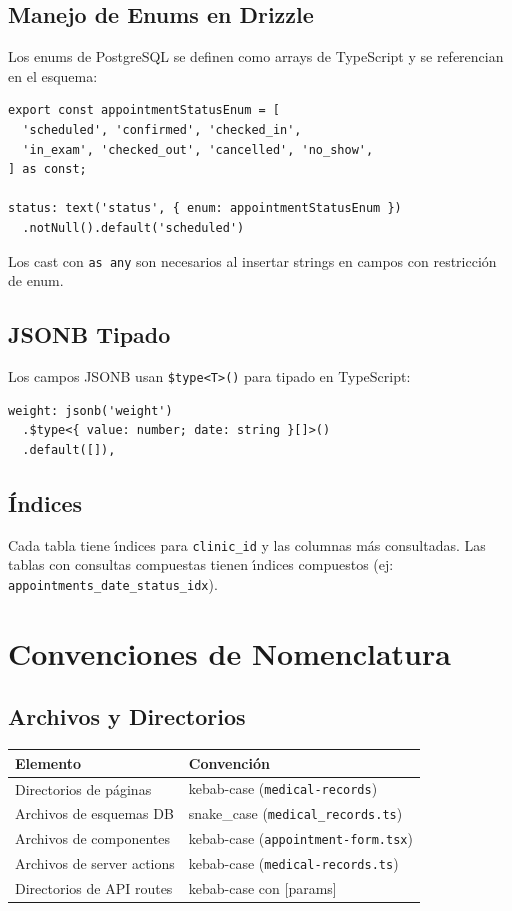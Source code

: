 \subsection{Manejo de Enums en Drizzle}

Los enums de PostgreSQL se definen como arrays de TypeScript y se referencian
en el esquema:

\begin{lstlisting}[style=typescript, caption=Patron de enums en Drizzle]
export const appointmentStatusEnum = [
  'scheduled', 'confirmed', 'checked_in',
  'in_exam', 'checked_out', 'cancelled', 'no_show',
] as const;

status: text('status', { enum: appointmentStatusEnum })
  .notNull().default('scheduled')
\end{lstlisting}

Los cast con \texttt{as any} son necesarios al insertar strings en campos
con restricci\'on de enum.

\subsection{JSONB Tipado}

Los campos JSONB usan \texttt{\$type<T>()} para tipado en TypeScript:

\begin{lstlisting}[style=typescript, caption=Patron JSONB tipado]
weight: jsonb('weight')
  .$type<{ value: number; date: string }[]>()
  .default([]),
\end{lstlisting}

\subsection{\'Indices}

Cada tabla tiene \'{\i}ndices para \texttt{clinic\_id} y las columnas
m\'as consultadas. Las tablas con consultas compuestas tienen \'{\i}ndices
compuestos (ej: \texttt{appointments\_date\_status\_idx}).

\section{Convenciones de Nomenclatura}

\subsection{Archivos y Directorios}

\begin{longtable}{|l|l|}
\hline
\textbf{Elemento} & \textbf{Convenci\'on} \\
\hline
Directorios de p\'aginas & kebab-case (\texttt{medical-records}) \\
Archivos de esquemas DB & snake\_case (\texttt{medical\_records.ts}) \\
Archivos de componentes & kebab-case (\texttt{appointment-form.tsx}) \\
Archivos de server actions & kebab-case (\texttt{medical-records.ts}) \\
Directorios de API routes & kebab-case con [params] \\
\hline
\end{longtable}

